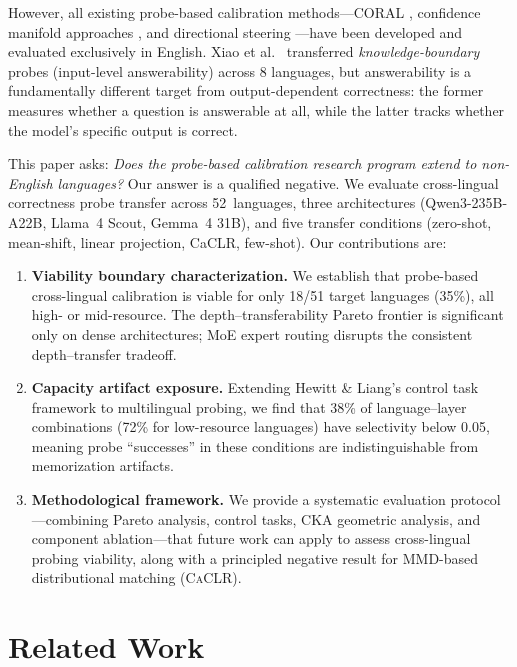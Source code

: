 \documentclass[11pt,a4paper]{article}
\newcommand{\caclr}{\textsc{CaCLR}}
\begin{document}
However, all existing probe-based calibration methods---CORAL \cite{miao2026coral}, confidence manifold approaches \cite{yu2025confidence}, and directional steering \cite{miao2026orthogonality}---have been developed and evaluated exclusively in English.
Xiao et al.\ \citeyear{xiao2025knowledge} transferred \emph{knowledge-boundary} probes (input-level answerability) across 8 languages, but answerability is a fundamentally different target from output-dependent correctness: the former measures whether a question is answerable at all, while the latter tracks whether the model's specific output is correct.

This paper asks: \textit{Does the probe-based calibration research program extend to non-English languages?}
Our answer is a qualified negative.
We evaluate cross-lingual correctness probe transfer across 52~languages, three architectures (Qwen3-235B-A22B, Llama~4 Scout, Gemma~4 31B), and five transfer conditions (zero-shot, mean-shift, linear projection, CaCLR, few-shot).
Our contributions are:

\begin{enumerate}
\item \textbf{Viability boundary characterization.} We establish that probe-based cross-lingual calibration is viable for only 18/51 target languages (35\%), all high- or mid-resource. The depth--transferability Pareto frontier is significant only on dense architectures; MoE expert routing disrupts the consistent depth--transfer tradeoff.

\item \textbf{Capacity artifact exposure.} Extending Hewitt \& Liang's \citeyear{hewitt2019designing} control task framework to multilingual probing, we find that 38\% of language--layer combinations (72\% for low-resource languages) have selectivity below 0.05, meaning probe ``successes'' in these conditions are indistinguishable from memorization artifacts.

\item \textbf{Methodological framework.} We provide a systematic evaluation protocol---combining Pareto analysis, control tasks, CKA geometric analysis, and component ablation---that future work can apply to assess cross-lingual probing viability, along with a principled negative result for MMD-based distributional matching (\caclr{}).
\end{enumerate}

\section{Related Work}
\label{sec:related}
\end{document}
